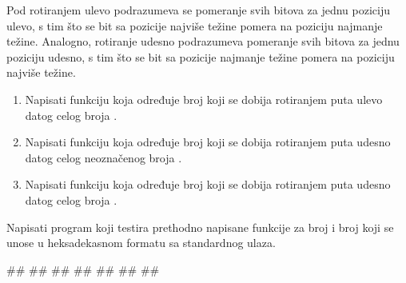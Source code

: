 \begin{Exercise}[label=205]
Pod rotiranjem ulevo podrazumeva se pomeranje svih bitova za jednu poziciju ulevo, s tim što se bit sa pozicije najviše težine pomera na poziciju najmanje težine. Analogno, rotiranje udesno podrazumeva pomeranje svih bitova za jednu poziciju udesno, s tim što se bit sa pozicije najmanje težine pomera na poziciju najviše težine.
\begin{enumerate}
\item Napisati funkciju  koja određuje broj koji se dobija rotiranjem  puta ulevo datog celog broja . 
\item Napisati funkciju  koja određuje broj koji se dobija rotiranjem  puta udesno datog celog neoznačenog broja . 
\item Napisati funkciju  koja određuje broj koji se dobija rotiranjem  puta udesno datog celog broja . 
\end{enumerate}
Napisati program koji testira prethodno napisane funkcije za broj  i broj  koji se unose u heksadekasnom formatu sa standardnog ulaza.


\begin{maxitest}
\begin{upotreba}{1}
#\naslovInt#
##
##
##
##
##
##
\end{upotreba}
\end{maxitest}

\end{Exercise}
\begin{Answer}[ref=205]
\end{Answer}

